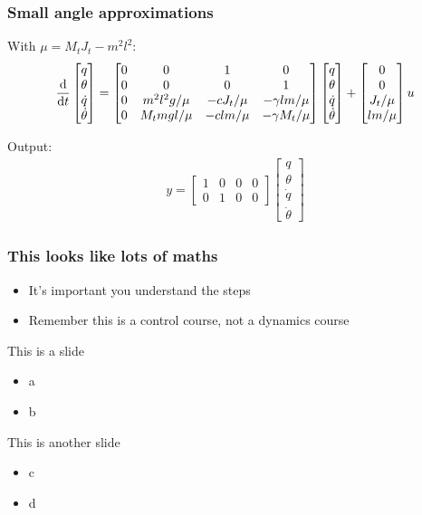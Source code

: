 \documentclass{beamer-control}
\begin{document}
\begin{frame}
\frametitle{Small angle approximations}
With $\mu = M_tJ_t - m^2l^2$:
\begin{equation}
\frac{\mathrm{d} }{\mathrm{d} t}
\begin{bmatrix}
q \\
\theta \\
\dot{q} \\
\dot{\theta}
\end{bmatrix}
=
\begin{bmatrix}
0 & 0 & 1 & 0 \\
0 & 0 & 0 & 1 \\
0 & m^2 l^2 g / \mu & -c J_t / \mu & -\gamma l m / \mu \\
0 & M_t m g l / \mu & -c l m / \mu & -\gamma M_t / \mu
\end{bmatrix}
\begin{bmatrix}
q \\
\theta \\
\dot{q} \\
\dot{\theta}
\end{bmatrix}
+
\begin{bmatrix}
0 \\
0 \\
J_t / \mu \\
l m / \mu
\end{bmatrix}
u
\end{equation}

Output:
\begin{align}
y = \begin{bmatrix}
1 & 0 & 0 & 0\\
0 & 1 & 0 & 0
\end{bmatrix}
\begin{bmatrix}
q \\
\theta \\
\dot{q} \\
\dot{\theta}
\end{bmatrix}
\end{align}
\end{frame}

\begin{frame}
\frametitle{This looks like lots of maths}
\begin{itemize}
\item It's important you understand the steps
\item Remember this is a control course, not a dynamics course
\end{itemize}
\end{frame}



\begin{frame}{This is a slide}
\begin{itemize}
\item a
\item b
\end{itemize}
\end{frame}




\begin{frame}{This is another slide}
\begin{itemize}
\item c
\item d
\end{itemize}
\end{frame}



\SUMMARYFRAME
\FINALE
\end{document}
